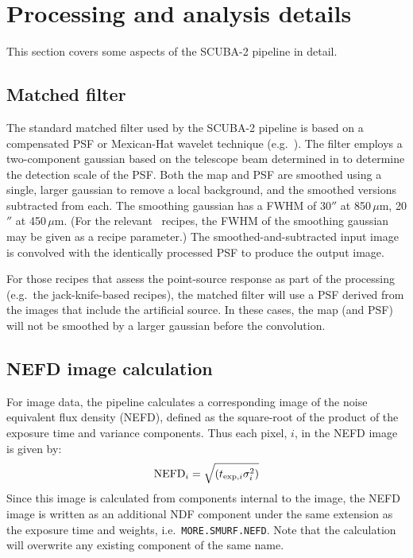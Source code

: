 \section{Processing and analysis details\label{procdetails}}

This section covers some aspects of the SCUBA-2 pipeline in detail.

\subsection{Matched filter}

The standard matched filter used by the SCUBA-2 pipeline is based on a
compensated PSF or Mexican-Hat wavelet technique
(e.g.\ \cite{mhwpaper}). The filter employs a two-component gaussian
based on the telescope beam determined in \cite{scuba2calpaper} to
determine the detection scale of the PSF. Both the map and PSF are
smoothed using a single, larger gaussian to remove a local background,
and the smoothed versions subtracted from each. The smoothing gaussian
has a FWHM of 30$''$ at 850\,$\mu$m, 20$''$ at 450\,$\mu$m. (For the
relevant \picard\ recipes, the FWHM of the smoothing gaussian may be
given as a recipe parameter.) The smoothed-and-subtracted input image
is convolved with the identically processed PSF to produce the output
image.

For those recipes that assess the point-source response as part of the
processing (e.g.\ the jack-knife-based recipes), the matched filter
will use a PSF derived from the images that include the artificial
source. In these cases, the map (and PSF) will not be smoothed by a
larger gaussian before the convolution.

\subsection{NEFD image calculation}

For image data, the pipeline calculates a corresponding image of the
noise equivalent flux density (NEFD), defined as the square-root of
the product of the exposure time and variance components. Thus each
pixel, $i$, in the NEFD image is given by:
\begin{equation}
{\rm NEFD}_i = \sqrt{(t_{{\rm exp},i} \sigma_i^2)}
\end{equation}
Since this image is calculated from components internal to the image,
the NEFD image is written as an additional NDF component under the
same extension as the exposure time and weights, i.e.\,
\verb+MORE.SMURF.NEFD+. Note that the calculation will overwrite any
existing component of the same name.

